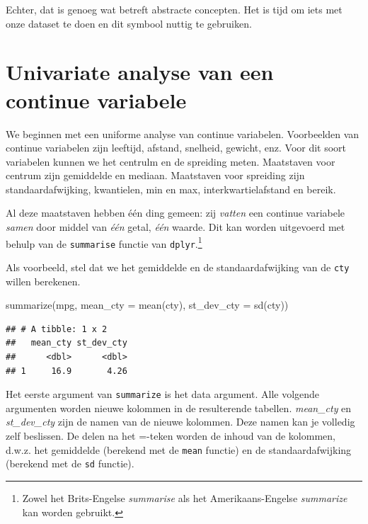 \documentclass[]{tufte-book}
\newenvironment{Shaded}{}{}
\newcommand{\AttributeTok}[1]{\textcolor[rgb]{0.49,0.56,0.16}{#1}}
\newcommand{\FunctionTok}[1]{\textcolor[rgb]{0.02,0.16,0.49}{#1}}
\newcommand{\NormalTok}[1]{#1}
\begin{document}
Echter, dat is genoeg wat betreft abstracte concepten. Het is tijd om iets met onze dataset te doen en dit symbool nuttig te gebruiken.

\hypertarget{univariate-analyse-van-een-continue-variabele}{%
\section{Univariate analyse van een continue variabele}\label{univariate-analyse-van-een-continue-variabele}}

We beginnen met een uniforme analyse van continue variabelen. Voorbeelden van continue variabelen zijn leeftijd, afstand, snelheid, gewicht, enz. Voor dit soort variabelen kunnen we het centrulm en de spreiding meten. Maatstaven voor centrum zijn gemiddelde en mediaan. Maatstaven voor spreiding zijn standaardafwijking, kwantielen, min en max, interkwartielafstand en bereik.

Al deze maatstaven hebben één ding gemeen: zij \emph{vatten} een continue variabele \emph{samen} door middel van \emph{één} getal, \emph{één} waarde. Dit kan worden uitgevoerd met behulp van de \texttt{summarise} functie van \texttt{dplyr}.\footnote{Zowel het Brits-Engelse \emph{summarise} als het Amerikaans-Engelse \emph{summarize} kan worden gebruikt.}

Als voorbeeld, stel dat we het gemiddelde en de standaardafwijking van de \texttt{cty} willen berekenen.

\begin{Shaded}
\begin{Highlighting}[]
\FunctionTok{summarize}\NormalTok{(mpg, }\AttributeTok{mean\_cty =} \FunctionTok{mean}\NormalTok{(cty), }\AttributeTok{st\_dev\_cty =} \FunctionTok{sd}\NormalTok{(cty))}
\end{Highlighting}
\end{Shaded}

\begin{verbatim}
## # A tibble: 1 x 2
##   mean_cty st_dev_cty
##      <dbl>      <dbl>
## 1     16.9       4.26
\end{verbatim}

Het eerste argument van \texttt{summarize} is het data argument. Alle volgende argumenten worden nieuwe kolommen in de resulterende tabellen. \emph{mean\_cty} en \emph{st\_dev\_cty} zijn de namen van de nieuwe kolommen. Deze namen kan je volledig zelf beslissen. De delen na het =-teken worden de inhoud van de kolommen, d.w.z. het gemiddelde (berekend met de \texttt{mean} functie) en de standaardafwijking (berekend met de \texttt{sd} functie).
\end{document}
